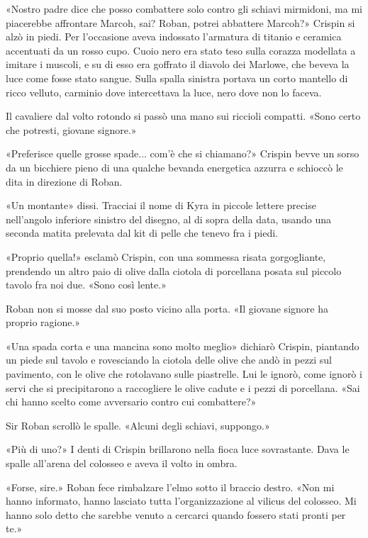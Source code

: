 «Nostro padre dice che posso combattere solo contro gli schiavi
mirmidoni, ma mi piacerebbe affrontare Marcoh, sai? Roban, potrei
abbattere Marcoh?» Crispin si alzò in piedi. Per l'occasione aveva
indossato l'armatura di titanio e ceramica accentuati da un rosso cupo.
Cuoio nero era stato teso sulla corazza modellata a imitare i muscoli, e
su di esso era goffrato il diavolo dei Marlowe, che beveva la luce come
fosse stato sangue. Sulla spalla sinistra portava un corto mantello di
ricco velluto, carminio dove intercettava la luce, nero dove non lo
faceva.

Il cavaliere dal volto rotondo si passò una mano sui riccioli compatti.
«Sono certo che potresti, giovane signore.»

«Preferisce quelle grosse spade... com'è che si chiamano?» Crispin bevve
un sorso da un bicchiere pieno di una qualche bevanda energetica azzurra
e schioccò le dita in direzione di Roban.

«Un montante» dissi. Tracciai il nome di Kyra in piccole lettere precise
nell'angolo inferiore sinistro del disegno, al di sopra della data,
usando una seconda matita prelevata dal kit di pelle che tenevo fra i
piedi.

«Proprio quella!» esclamò Crispin, con una sommessa risata gorgogliante,
prendendo un altro paio di olive dalla ciotola di porcellana posata sul
piccolo tavolo fra noi due. «Sono così lente.»

Roban non si mosse dal suo posto vicino alla porta. «Il giovane signore
ha proprio ragione.»

«Una spada corta e una mancina sono molto meglio» dichiarò Crispin,
piantando un piede sul tavolo e rovesciando la ciotola delle olive che
andò in pezzi sul pavimento, con le olive che rotolavano sulle
piastrelle. Lui le ignorò, come ignorò i servi che si precipitarono a
raccogliere le olive cadute e i pezzi di porcellana. «Sai chi hanno
scelto come avversario contro cui combattere?»

Sir Roban scrollò le spalle. «Alcuni degli schiavi, suppongo.»

«Più di uno?» I denti di Crispin brillarono nella fioca luce
sovrastante. Dava le spalle all'arena del colosseo e aveva il volto in
ombra.

«Forse, sire.» Roban fece rimbalzare l'elmo sotto il braccio destro.
«Non mi hanno informato, hanno lasciato tutta l'organizzazione al
vilicus del colosseo. Mi hanno solo detto che sarebbe venuto a cercarci
quando fossero stati pronti per te.»

